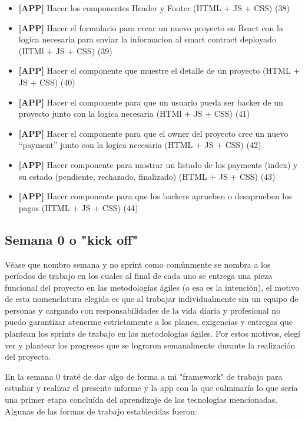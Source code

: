 \begin{itemize}
\item \textbf{[APP]} Hacer los componentes Header y Footer (HTML + JS + CSS) (38)
\item \textbf{[APP]} Hacer el formulario para crear un nuevo proyecto en React con la logica
necesaria para enviar la informacion al smart contract deployado (HTMl + JS + CSS) (39)
\item \textbf{[APP]} Hacer el componente que muestre el detalle de un proyecto (HTML + JS + CSS) (40)
\item \textbf{[APP]} Hacer el componente para que un usuario pueda ser backer de un proyecto junto
con la logica necesaria (HTMl + JS + CSS) (41)
\item \textbf{[APP]} Hacer el componente para que el owner del proyecto cree un nuevo “payment”
junto con la logica necesaria (HTML + JS + CSS) (42)
\item \textbf{[APP]} Hacer componente para mostrar un listado de los payments (index) y su estado
(pendiente, rechazado, finalizado) (HTML + JS + CSS) (43)
\item \textbf{[APP]} Hacer componente para que los backers aprueben o desaprueben los pagos (HTML +
 JS + CSS) (44)

\end{itemize}

\subsection{Semana 0 o "kick off"}
Véase que nombro semana y no sprint como comúnmente se nombra a los períodos de trabajo en los 
cuales al final de cada uno se entrega una pieza funcional del proyecto en las metodologías ágiles
(o esa es la intención), el motivo de esta nomenclatura elegida es que al trabajar individualmente 
sin un equipo de personas y cargando con responsabilidades de la vida diaria y profesional no puedo
garantizar atenerme estrictamente a los planes, exigencias y entregas que plantean los sprints de 
trabajo en las metodologías ágiles. Por estos motivos, elegí ver y plantear los progresos que se 
lograron semanalmente durante la realización del proyecto.

En la semana 0 traté de dar algo de forma a mi "framework" de trabajo para estudiar
y realizar el presente informe y la app con la que culminaría lo que sería una primer etapa
concluída del aprendizaje de las tecnologías mencionadas. Algunas de las formas de trabajo 
establecidas fueron:

